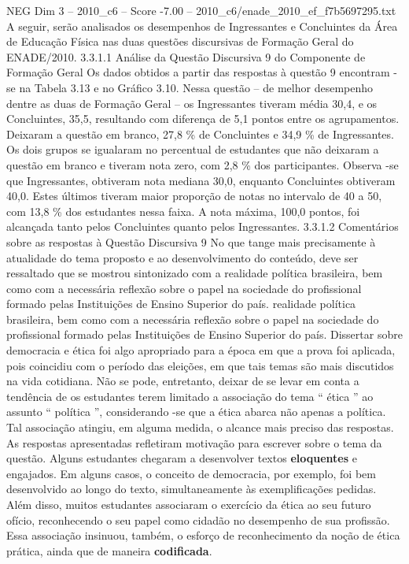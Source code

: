 \begin{textsample}{NEG Dim 3 – 2010\_c6 – Score -7.00 – 2010\_c6/enade\_2010\_ef\_f7b5697295.txt}
A seguir, serão analisados os desempenhos de Ingressantes e Concluintes da Área de Educação Física nas duas questões discursivas de Formação Geral do ENADE/2010. 3.3.1.1 Análise da Questão Discursiva 9 do Componente de Formação Geral Os dados obtidos a partir das respostas à questão 9 encontram -se na Tabela 3.13 e no Gráfico 3.10.
Nessa questão – de melhor desempenho dentre as duas de Formação Geral – os Ingressantes tiveram média 30,4, e os Concluintes, 35,5, resultando com diferença de 5,1 pontos entre os agrupamentos.
Deixaram a questão em branco, 27,8 \% de Concluintes e 34,9 \% de Ingressantes.
Os dois grupos se igualaram no percentual de estudantes que não deixaram a questão em branco e tiveram nota zero, com 2,8 \% dos participantes.
Observa -se que Ingressantes, obtiveram nota mediana 30,0, enquanto Concluintes obtiveram 40,0.
Estes últimos tiveram maior proporção de notas no intervalo de 40 a 50, com 13,8 \% dos estudantes nessa faixa.
A nota máxima, 100,0 pontos, foi alcançada tanto pelos Concluintes quanto pelos Ingressantes. 3.3.1.2 Comentários sobre as respostas à Questão Discursiva 9 No que tange mais precisamente à atualidade do tema proposto e ao desenvolvimento do conteúdo, deve ser ressaltado que se mostrou sintonizado com a realidade política brasileira, bem como com a necessária reflexão sobre o papel na sociedade do profissional formado pelas Instituições de Ensino Superior do país. realidade política brasileira, bem como com a necessária reflexão sobre o papel na sociedade do profissional formado pelas Instituições de Ensino Superior do país.
Dissertar sobre democracia e ética foi algo apropriado para a época em que a prova foi aplicada, pois coincidiu com o período das eleições, em que tais temas são mais discutidos na vida cotidiana.
Não se pode, entretanto, deixar de se levar em conta a tendência de os estudantes terem limitado a associação do tema “ ética ” ao assunto “ política ”, considerando -se que a ética abarca não apenas a política.
Tal associação atingiu, em alguma medida, o alcance mais preciso das respostas.
As respostas apresentadas refletiram motivação para escrever sobre o tema da questão.
Alguns estudantes chegaram a desenvolver textos \textbf{eloquentes} e engajados.
Em alguns casos, o conceito de democracia, por exemplo, foi bem desenvolvido ao longo do texto, simultaneamente às exemplificações pedidas.
Além disso, muitos estudantes associaram o exercício da ética ao seu futuro ofício, reconhecendo o seu papel como cidadão no desempenho de sua profissão.
Essa associação insinuou, também, o esforço de reconhecimento da noção de ética prática, ainda que de maneira \textbf{codificada}.

\end{textsample}
